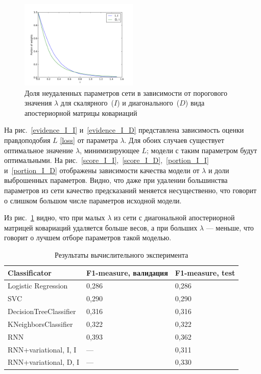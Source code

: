 \begin{figure}[!h]
	\centering
	\includegraphics[width=0.5\textwidth]{plots/smerdov/lambdas.pdf}
	\caption{Доля неудаленных параметров сети в зависимости от порогового значения $\lambda$ для скалярного~($I$) и диагонального~($D$) вида апостериорной матрицы ковариаций}
	\label{lambdas}
\end{figure}

 

На рис.~\ref{evidence_I_I} и~\ref{evidence_I_D} представлена зависимость оценки правдоподобия $L$ \eqref{loss} от параметра $\lambda$.
Для обоих случаев существует оптимальное значение $\lambda$, минимизирующее $L$; модели с таким параметром будут оптимальными. На рис.~\ref{score_I_I},~\ref{score_I_D},~\ref{portion_I_I} и~\ref{portion_I_D} отображены зависимости качества модели от $\lambda$ и доли выброшенных параметров. Видно, что даже при удалении большинства параметров из сети качество предсказаний меняется несущественно, что говорит о слишком большом числе параметров исходной модели.

Из рис.~\ref{lambdas} видно, что при малых $\lambda$ из сети с диагональной апостериорной матрицей ковариаций удаляется больше весов, а при больших $\lambda$ --- меньше, что говорит о лучшем отборе параметров такой моделью.


\begin{table}[!htp]
	\centering
	\caption{Результаты вычислительного эксперимента}
	\label{my-label}
	\begin{tabular}{|l|l|l|}
		\hline
		Classificator          & F1-measure, валидация & F1-measure, test \\ \hline
		Logistic Regression    & 0,286                 & 0,286            \\ \hline
		SVC                    & 0,290                 & 0,290            \\ \hline
		DecisionTreeClassifier & 0,316                 & 0,316            \\ \hline
		KNeighborsClassifier   & 0,322                 & 0,322            \\ \hline
		RNN                    & 0,393                 & 0,362            \\ \hline
		RNN+variational, I, I  &  ---                     & 0,311            \\ \hline
		RNN+variational, D, I  &  ---                     & 0,330             \\ \hline
	\end{tabular}
\end{table}


